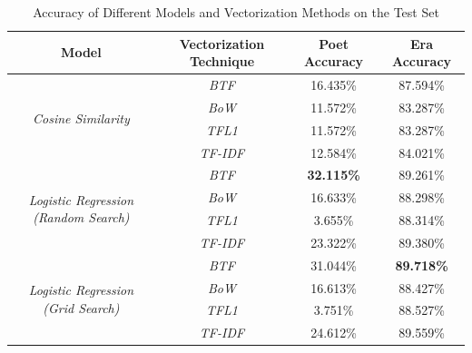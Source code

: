 \documentclass[11pt,a4paper]{article}
\begin{document}
\begin{table}[htb!]
\setlength\tabcolsep{0pt}
\smallskip 
\begin{tabular*}{\textwidth}{@{\extracolsep{\fill}}cccc}
\toprule
  \textbf{Model}  & \textbf{Vectorization Technique} & \textbf{Poet Accuracy} & \textbf{Era Accuracy} \\
\midrule
  \multirow{4}{*}{\textit{Cosine Similarity}} & \textit{BTF}   & 16.435\%    &  87.594\%    \\
   & \textit{BoW}   & 11.572\%    &  83.287\%    \\
   & \textit{TFL1}   & 11.572\%    &  83.287\%    \\
   & \textit{TF-IDF}   & 12.584\%    &  84.021\%    \\
  \midrule
  \multirow{4}{4cm}{\centering\textit{Logistic Regression (Random Search)}} & \textit{BTF}   & \textbf{32.115\%}    &  89.261\%    \\
   & \textit{BoW}   & 16.633\%    &  88.298\%    \\
   & \textit{TFL1}   & 3.655\%    &  88.314\%    \\
   & \textit{TF-IDF}   & 23.322\%    &  89.380\%    \\
  \midrule
  \multirow{4}{3.5cm}{\centering\textit{Logistic Regression (Grid Search)}} & \textit{BTF}   & 31.044\%    &  \textbf{89.718\%}    \\
   & \textit{BoW}   & 16.613\%    &  88.427\%    \\
   & \textit{TFL1}   & 3.751\%    &  88.527\%    \\
   & \textit{TF-IDF}   & 24.612\%    &  89.559\%    \\
\bottomrule
\end{tabular*}
\caption{Accuracy of Different Models and Vectorization Methods on the Test Set} \label{results}
\end{table}
\end{document}

